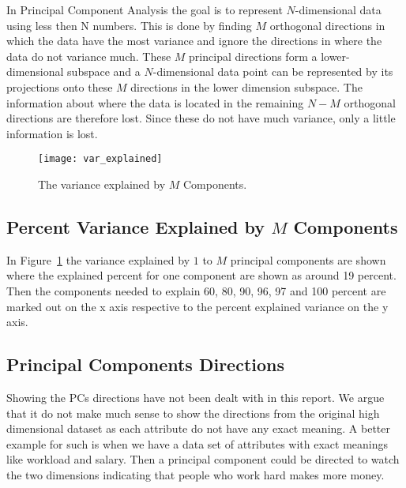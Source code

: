 
In Principal Component Analysis the goal is to represent $N$-dimensional data using less then N numbers. This is done by finding $M$ orthogonal directions in which the data have the most variance and ignore the directions in where the data do not variance much. These $M$ principal directions form a lower-dimensional subspace and a $N$-dimensional data point can be represented by its projections onto these $M$ directions in the lower dimension subspace. The information about where the data is located in the remaining $N-M$ orthogonal directions are therefore lost. Since these do not have much variance, only a little information is lost.

\begin{figure}[hbtp]
\centering
\texttt{[image: var\_explained]}
\caption{The variance explained by $M$ Components.\label{fig:pca_var_explained}}
\end{figure}

\subsection{Percent Variance Explained by $M$ Components}

In Figure~\ref{fig:pca_var_explained} the variance explained by $1$ to $M$ principal components are shown where the explained percent for one component are shown as around 19 percent. Then the components needed to explain 60, 80, 90, 96, 97 and 100 percent are marked out on the x axis respective to the percent explained variance on the y axis.

\subsection{Principal Components Directions}
Showing the PCs directions have not been dealt with in this report. We argue that it do not make much sense to show the directions from the original high dimensional dataset as each attribute do not have any exact meaning. A better example for such is when we have a data set of attributes with exact meanings like workload and salary. Then a principal component could be directed to watch the two dimensions indicating that people who work hard makes more money.


